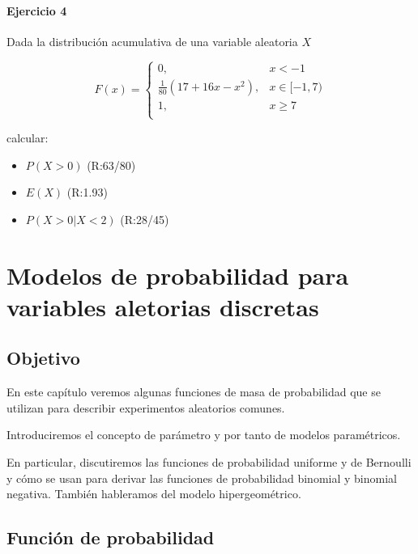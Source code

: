 \documentclass[
]{book}
\providecommand{\tightlist}{%
  \setlength{\itemsep}{0pt}\setlength{\parskip}{0pt}}
\begin{document}
\hypertarget{ejercicio-4-2}{%
\subsubsection{Ejercicio 4}\label{ejercicio-4-2}}

Dada la distribución acumulativa de una variable aleatoria \(X\)

\[
    F(x)= 
\begin{cases}
0, & x  < -1 \\
\frac{1}{80}(17+16x-x^2),& x \in [-1,7)\\
1,& x \geq 7\\
\end{cases}
\]

calcular:

\begin{itemize}
\tightlist
\item
  \(P(X> 0)\) (R:63/80)
\item
  \(E(X)\) (R:1.93)
\item
  \(P(X>0|X< 2)\) (R:28/45)
\end{itemize}

\hypertarget{modelos-de-probabilidad-para-variables-aletorias-discretas}{%
\chapter{Modelos de probabilidad para variables aletorias discretas}\label{modelos-de-probabilidad-para-variables-aletorias-discretas}}

\hypertarget{objetivo-3}{%
\section{Objetivo}\label{objetivo-3}}

En este capítulo veremos algunas funciones de masa de probabilidad que se utilizan para describir experimentos aleatorios comunes.

Introduciremos el concepto de parámetro y por tanto de modelos paramétricos.

En particular, discutiremos las funciones de probabilidad uniforme y de Bernoulli y cómo se usan para derivar las funciones de probabilidad binomial y binomial negativa. También hableramos del modelo hipergeométrico.

\hypertarget{funciuxf3n-de-probabilidad}{%
\section{Función de probabilidad}\label{funciuxf3n-de-probabilidad}}
\end{document}
